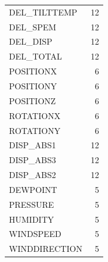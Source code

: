 \begin{table}[H]
\begin{tabular}{lr}
        DEL\_TILTTEMP &                   12 \\
        DEL\_SPEM &                   12 \\
        DEL\_DISP &                   12 \\
        DEL\_TOTAL &                   12 \\
        POSITIONX &                    6 \\
        POSITIONY &                    6 \\
        POSITIONZ &                    6 \\
        ROTATIONX &                    6 \\
        ROTATIONY &                    6 \\
        DISP\_ABS1 &                   12 \\
        DISP\_ABS3 &                   12 \\
        DISP\_ABS2 &                   12 \\
        DEWPOINT &                    5 \\
        PRESSURE &                    5 \\
        HUMIDITY &                    5 \\
        WINDSPEED &                    5 \\
        WINDDIRECTION &                    5\\
        \bottomrule
    \end{tabular}
    \label{tab:data_frequency}
\end{table}


